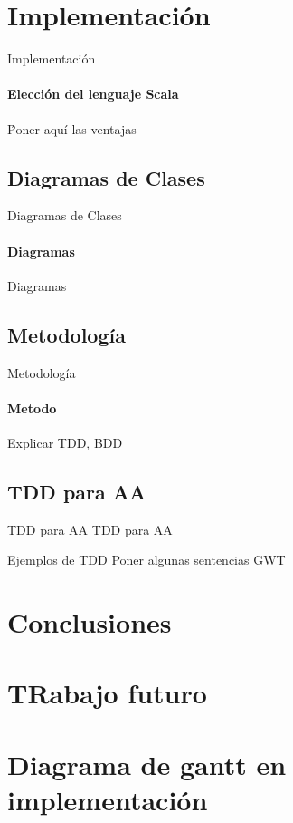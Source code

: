 \documentclass[utf8]{beamer}
\begin{document}
\section{Implementación}

\begin{frame}{Implementación}
  \framesubtitle{Elección del lenguaje Scala}
  Ṕoner aquí las ventajas
\end{frame}

\subsection{Diagramas de Clases}
\begin{frame}{Diagramas de Clases}
  \framesubtitle{Diagramas}
  Diagramas
\end{frame}

\subsection{Metodología}
\begin{frame}{Metodología}
  \framesubtitle{Metodo}
  Explicar TDD, BDD
\end{frame}

\subsection{TDD para AA}
\begin{frame}{TDD para AA}
    TDD para AA
\end{frame}

\begin{frame}{Ejemplos de TDD}
  Poner algunas sentencias GWT    
\end{frame}

\section{Conclusiones}
\section{TRabajo futuro}
\section{Diagrama de gantt en implementación}


\end{document}
